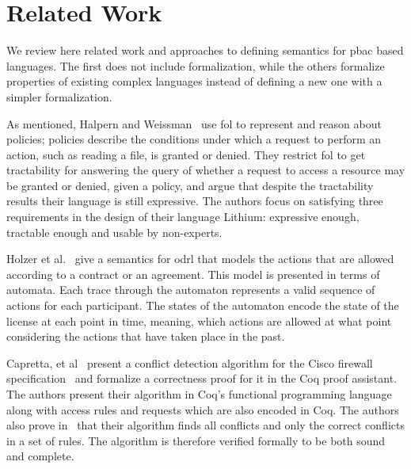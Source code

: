 \documentclass[conference]{IEEEtran}
\begin{document}
\section{Related Work}
We review here related work and approaches to defining semantics for
\ac{pbac} based languages.
The first does not include formalization, while the others formalize
properties of existing complex languages instead of defining a new one
with a simpler formalization.
 
As mentioned, Halpern and Weissman~\cite{Halpern2008} use \ac{fol} to represent and reason about policies; policies describe the conditions under which a request to perform an action, such as reading a file, is granted or denied. They restrict \ac{fol} to get tractability for answering the query of whether a request to access a resource may be granted or denied, given a policy, and argue that despite the tractability results their language is still expressive. The authors focus on satisfying three requirements in the design of their language Lithium: expressive enough, tractable enough and usable by non-experts.

Holzer et al.~\cite{Holzer} give a semantics for \ac{odrl} that models the actions that are allowed according to a contract or an agreement. This model is presented in terms of automata. Each trace through the automaton represents a valid sequence of actions for each participant. The states of the automaton encode the state of the license at each point in time, meaning, which actions are allowed at what point considering the actions that have taken place in the past. 


Capretta, et al~\cite{CaprettaSFM07} present a conflict detection algorithm for the Cisco firewall specification~\cite{ciscofirewall} and formalize a correctness proof for it in the Coq proof assistant. The authors present their algorithm in Coq's functional programming language along with access rules and requests which are also encoded in Coq. The authors also prove in~\cite{CaprettaSFM07} that their algorithm finds all conflicts and only the correct conflicts in a set of rules. The algorithm is therefore verified formally to be both sound and complete.
\end{document}
